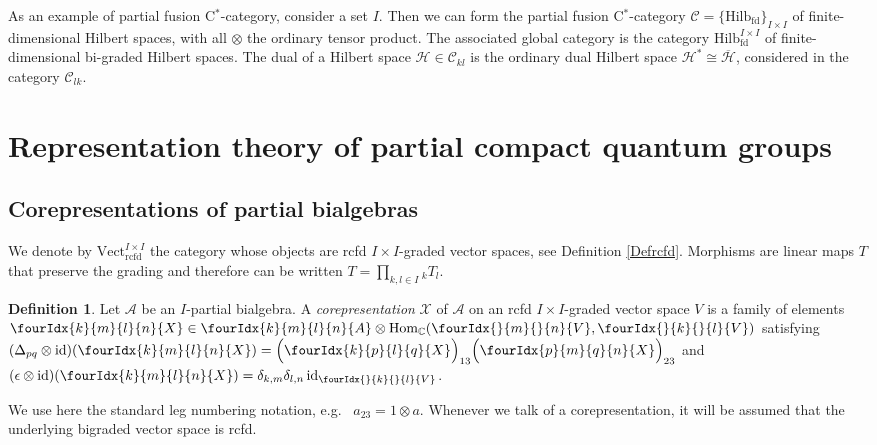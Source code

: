 \documentclass[10pt]{article}
\DeclareMathOperator{\fin}{\mathrm{fd}}
\DeclareMathOperator{\id}{id}
\DeclareMathOperator{\Hom}{Hom}
\DeclareMathOperator{\rcf}{\mathrm{rcfd}}
\newcommand{\C}{\mathbb{C}}
\newcommand{\Hsp}{\mathcal{H}}
\newcommand{\CatC}{\mathcal{C}}
\newcommand{\CatCC}{\mathscr{C}}
\newcommand{\Vectrcf}{\mathrm{Vect}^{I\times I}_{\rcf}}
\newcommand{\Hilb}{\mathrm{Hilb}}
\newcommand{\Hilbif}{\mathrm{Hilb}^{I\times I}_{\fin}}
\newcommand{\GrDA}[3]{{}_{#2}#1_{#3}} %
\newcommand{\Gr}[5]{\fourIdx{#2}{#4}{#3}{#5}{#1}}%
\newcommand{\Gru}[3]{\Gr{#1}{}{}{#2}{#3}}
\theoremstyle{definition}
\newtheorem{Def}[Theorem]{Definition}
\numberwithin{equation}{section}
\begin{document}
As an example of partial fusion C$^*$-category, consider a set  $I$. Then we can form the partial fusion C$^*$-category $\CatCC = \{\Hilb_{\fin}\}_{I\times I}$ of finite-dimensional Hilbert spaces, with all $\otimes$ the ordinary tensor product. The associated global category is the category $\Hilbif$ of finite-dimensional bi-graded Hilbert spaces. The dual of a Hilbert space $\Hsp \in \CatC_{kl}$ is the ordinary dual Hilbert space $\Hsp^* \cong \overline{\Hsp}$, considered in the category $\CatC_{lk}$. 


\section{Representation theory of partial compact quantum groups}

\subsection{Corepresentations of partial bialgebras}

We denote by  $\Vectrcf$ the category whose objects are rcfd $I\times I$-graded vector spaces, see Definition \ref{Defrcfd}. Morphisms are linear maps $T$ that preserve the grading and therefore
can be written $T=\prod_{k,l\in I} \GrDA{T}{k}{l}$. 

\begin{Def} \label{definition:corep} Let $\mathscr{A}$ be an
  $I$-partial bialgebra. A \emph{corepresentation}
  $\mathscr{X}$ of $\mathscr{A}$ on an rcfd $I\times I$-graded vector space $V$
  is a family of elements $\Gr{X}{k}{l}{m}{n} \in \Gr{A}{k}{l}{m}{n} \otimes
  \Hom_\C(\Gru{V}{m}{n},\Gru{V}{k}{l})$
 satisfying $ (\Delta_{pq} \otimes
    \id)(\Gr{X}{k}{l}{m}{n}) =
    \Big{(}\Gr{X}{k}{l}{p}{q}\Big{)}_{13}\Big{(}\Gr{X}{p}{q}{m}{n}\Big{)}_{23}$ and
     $(\epsilon \otimes
  \id)(\Gr{X}{k}{l}{m}{n})=\delta_{k,m}\delta_{l,n}\id_{\Gru{V}{k}{l}}$.
\end{Def}
We use here the standard leg numbering notation, e.g.~ $a_{23}=1\otimes a$. Whenever we talk of a corepresentation, it will be assumed that the underlying bigraded vector space is rcfd.
\end{document}
